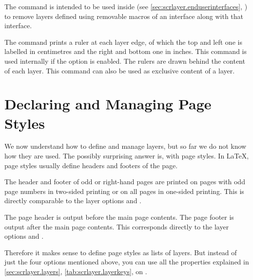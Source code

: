 The command is intended to be used inside
 (see
\autoref{sec:scrlayer.enduserinterfaces},
)
to remove layers defined using removable macros of an interface along with
that interface.%
\EndIndexGroup


\begin{Declaration}
\end{Declaration}
The  command prints a ruler at each layer edge, of
which the top and left one is labelled in centimetres and the right and bottom
one in inches. This command is used internally if the
 option is enabled. The
rulers are drawn behind the content of each layer. This command can also be
used as exclusive content of a layer.%
\EndIndexGroup


\section{Declaring and Managing Page Styles}

\BeginIndexGroup
{}%
We now understand how to define and manage layers, but so far we do not know 
how they are used. The possibly surprising answer is, with page styles. In
\LaTeX{}, page styles usually define headers and footers of the page.

The header and footer of odd or right-hand pages
are printed on pages with odd page numbers in two-sided printing or on all
pages in one-sided printing. This is directly comparable to the layer 
options  and
.

The page header is output before the main page
contents. The page footer is output after the main page contents. This
corresponds directly to the layer
options
 and .

Therefore it makes sense to define page styles as lists of layers. But instead
of just the four options mentioned above, you can use all the properties
explained in \autoref{sec:scrlayer.layers}, \autoref{tab:scrlayer.layerkeys}, 
on .

